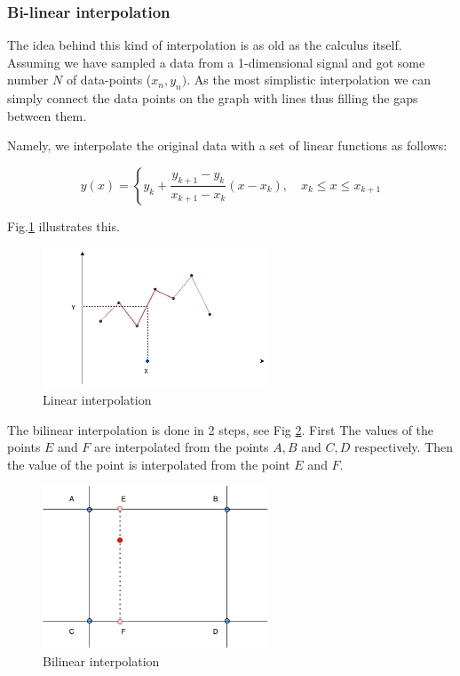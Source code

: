 \documentclass[11pt]{book}
\begin{document}
\subsubsection{Bi-linear interpolation} 

The idea behind this kind of interpolation is as old as the calculus itself. Assuming we have sampled a data from a 1-dimensional signal and got some number $N$ of data-points ($x_n, y_n)$. As the most simplistic interpolation we can simply connect the data points on the graph with lines thus filling the gaps between them.

 Namely,  we interpolate the original data with a set of linear functions as follows:

\begin{equation}
y(x) = \left\{y_k + \frac{y_{k+1} - y_{k}}{x_{k+1} - x_k} (x - x_k), \quad x_k \leq x \leq x_{k+1}\right.
\end{equation}

 Fig.\ref{fig:linear_interpolation} illustrates this.
 
\begin{figure}[h]
\centering
\includegraphics[width=0.6\textwidth]{images/lin.drawio.png}
\caption{Linear interpolation}
\label{fig:linear_interpolation}
\end{figure}

The bilinear interpolation is done in 2 steps, see Fig \ref{fig:bilinear_interpolation}. First The values of the points $E$ and $F$ are interpolated from the points $A,B$ and $C,D$ respectively. Then the value of the point is interpolated from the point $E$ and $F$. 

\begin{figure}[h]
\centering
\includegraphics[width=0.6\textwidth]{images/bilin.drawio.png}
\caption{Bilinear interpolation}
\label{fig:bilinear_interpolation}
\end{figure}
\end{document}
